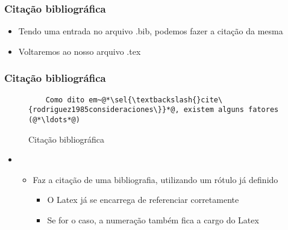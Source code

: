 \begin{frame}[fragile] \frametitle{Citação bibliográfica}
\begin{itemize}
	\item Tendo uma entrada no arquivo .bib, podemos fazer a citação da mesma
	\item Voltaremos ao nosso arquivo .tex
\end{itemize}
\end{frame}

\begin{frame}[fragile] \frametitle{Citação bibliográfica}
\vspace{-0.5cm}
\begin{figure}[!t]
\caption{Citação bibliográfica}
\begin{lstlisting}
	Como dito em~@*\sel{\textbackslash{}cite\{rodriguez1985consideraciones\}}*@, existem alguns fatores (@*\ldots*@)
\end{lstlisting}
\ownsrc
\end{figure}

\begin{itemize}
	\item {}
	\begin{itemize}
		\item Faz a citação de uma bibliografia, utilizando um rótulo já definido
		\begin{itemize}
			\item O Latex já se encarrega de referenciar corretamente
			\item Se for o caso, a numeração também fica a cargo do Latex
		\end{itemize}
	\end{itemize}
\end{itemize}
\end{frame}